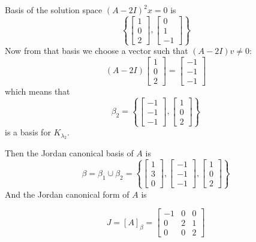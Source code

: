 \begin{homeworkProblem}
Basis of the solution space $(A-2I)^2 x = 0$ is \[
  \left\{
    \begin{bmatrix}
      1\\0\\2
    \end{bmatrix},
    \begin{bmatrix}
      0\\1\\-1
    \end{bmatrix}
  \right\}
\]
Now from that basis we choose a vector such that $(A-2I)v \neq 0$:
\[
  (A-2I)\begin{bmatrix}
    1\\0\\2
  \end{bmatrix} = \begin{bmatrix}
    -1\\-1\\-1
  \end{bmatrix}
\]
which means that \[
  \beta_2 = \left\{
  \begin{bmatrix}
    -1\\-1\\-1
  \end{bmatrix}, \begin{bmatrix}
    1\\0\\2
  \end{bmatrix}
  \right\}
\]
is a basis for $K_{\lambda_2}$.

Then the Jordan canonical basis of $A$ is \[
  \beta = \beta_1 \cup \beta_2 = \left\{
    \begin{bmatrix}
      1\\3\\0
    \end{bmatrix}, \begin{bmatrix}
      -1\\-1\\-1
    \end{bmatrix}, \begin{bmatrix}
      1\\0\\2
    \end{bmatrix}
  \right\}
\]
And the Jordan canonical form of $A$ is

\[
J = [A]_\beta = \begin{bmatrix}
  -1 & 0 & 0 \\
  0 & 2 & 1 \\
  0 & 0 & 2
\end{bmatrix}
\]

\end{homeworkProblem}
